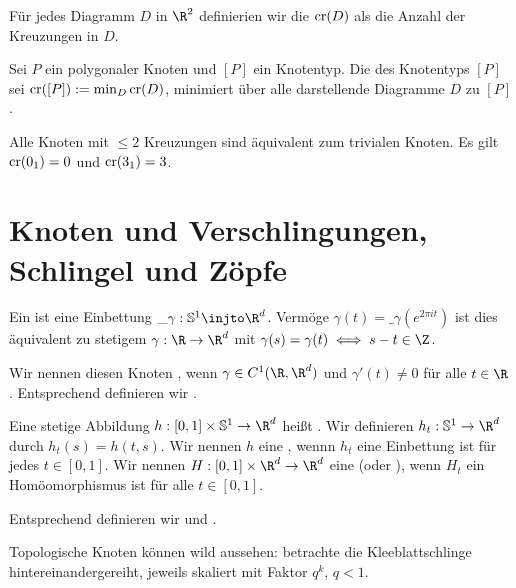 \begin{df}
    Für jedes Diagramm $D$ in $\R^2$ definierien wir die  $\operatorname{cr}(D)$ als die Anzahl der Kreuzungen in $D$.

    Sei $P$ ein polygonaler Knoten und $[P]$ ein Knotentyp.
    Die  des Knotentyps $[P]$ sei $\operatorname{cr}([P]) := \min_D \operatorname{cr}(D)$, minimiert über alle darstellende Diagramme $D$ zu $[P]$.
\end{df}

\begin{ex}
    Alle Knoten mit $\le 2$ Kreuzungen sind äquivalent zum trivialen Knoten.
    Es gilt $\operatorname{cr}(\mathord{0_1}) = 0$ und $\operatorname{cr}(\mathord{3_1}) = 3$.
\end{ex}


\section{Knoten und Verschlingungen, Schlingel und Zöpfe}

\begin{df}
    Ein  ist eine Einbettung $\_\gamma: \S^1 \injto \R^d$.
    Vermöge $\gamma(t) = \_\gamma(e^{2\pi i t})$ ist dies äquivalent zu stetigem $\gamma: \R \to \R^d$ mit $\gamma(s) = \gamma(t) \iff s - t \in \Z$.

    Wir nennen diesen Knoten , wenn $\gamma \in C^1(\R, \R^d)$ und $\gamma'(t) \neq 0$ für alle $t \in \R$.
    Entsprechend definieren wir .
\end{df}

\begin{df}
    Eine stetige Abbildung $h: [0,1] \times \S^1 \to \R^d$ heißt .
    Wir definieren $h_t: \S^1 \to \R^d$ durch $h_t(s) = h(t,s)$.
    Wir nennen $h$ eine , wennn $h_t$ eine Einbettung ist für jedes $t \in [0,1]$.
    Wir nennen $H: [0,1] \times \R^d \to \R^d$ eine  (oder ), wenn $H_t$ ein Homöomorphismus ist für alle $t \in [0,1]$.

    Entsprechend definieren wir  und .
\end{df}

\begin{note}
    Topologische Knoten können wild aussehen: betrachte die Kleeblattschlinge hintereinandergereiht, jeweils skaliert mit Faktor $q^k$, $q < 1$.
\end{note}

